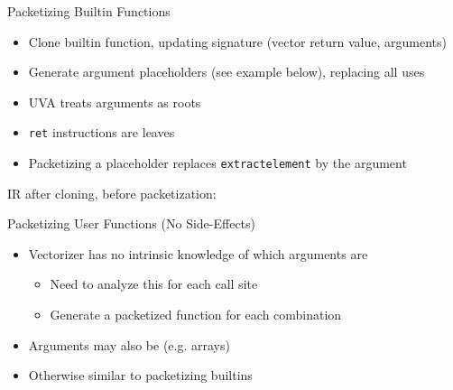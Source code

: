 \begin{frame}[fragile]{Packetizing Builtin Functions}

\begin{itemize}
    \item Clone builtin function, updating signature (vector return value, arguments)
    \item Generate argument placeholders (see example below), replacing all uses
    \item UVA treats arguments as roots
    \item \texttt{ret} instructions are leaves
    \item Packetizing a placeholder replaces \texttt{extractelement} by the argument
\end{itemize}

IR after cloning, before packetization:


\end{frame}


\begin{frame}{Packetizing User Functions (No Side-Effects)}

\begin{itemize}
    \item Vectorizer has no intrinsic knowledge of which arguments are 
    \begin{itemize}
        \item Need to analyze this for each call site
        \item Generate a packetized function for each combination
    \end{itemize}
    \item Arguments may also be  (e.g. arrays)
    \item Otherwise similar to packetizing builtins 
\end{itemize}

\end{frame}

